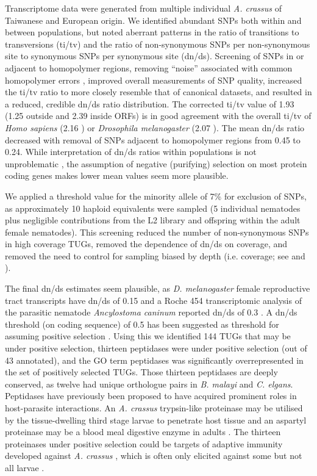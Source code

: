 \documentclass[10pt]{bmc_article}
\newenvironment{bmcformat}{\begin{raggedright}\baselineskip20pt\sloppy\setboolean{publ}{false}}{\end{raggedright}\baselineskip20pt\sloppy}
\begin{document}
\begin{bmcformat}
Transcriptome data were generated from multiple individual
\textit{A. crassus} of Taiwanese and European origin. We identified
abundant SNPs both within and between populations, but noted aberrant
patterns in the ratio of transitions to transversions (ti/tv) and the
ratio of non-synonymous SNPs per non-synonymous site to synonymous
SNPs per synonymous site (dn/ds). Screening of SNPs in or adjacent to
homopolymer regions, removing “noise'' associated with common
homopolymer errors \cite{pmid21685085}, improved overall measurements
of SNP quality, increased the ti/tv ratio to more closely resemble
that of canonical datasets, and resulted in a reduced, credible dn/ds
ratio distribution. The corrected ti/tv value of 1.93 (1.25 outside
and 2.39 inside ORFs) is in good agreement with the overall ti/tv of
\textit{Homo sapiens} (2.16 \cite{pmid21169219}) or \textit{Drosophila
  melanogaster} (2.07 \cite{pmid21143862}). The mean dn/ds ratio
decreased with removal of SNPs adjacent to homopolymer regions from
0.45 to 0.24. While interpretation of dn/ds ratios within populations
is not unproblematic \cite{pmid19081788}, the assumption of negative
(purifying) selection on most protein coding genes makes lower mean
values seem more plausible.

We applied a threshold value for the minority allele of 7\% for
exclusion of SNPs, as approximately 10 haploid equivalents were
sampled (5 individual nematodes plus negligible contributions from the
L2 library and offspring within the adult female nematodes). This
screening reduced the number of non-synonymous SNPs in high coverage
TUGs, removed the dependence of dn/ds on coverage, and removed the
need to control for sampling biased by depth (i.e. coverage; see
\cite{pmid18590545} and \cite{pmid20478048}).

The final dn/ds estimates seem plausible, as \textit{D. melanogaster}
female reproductive tract transcripts have dn/ds of 0.15
\cite{pmid15579698} and a Roche 454 transcriptomic analysis of the
parasitic nematode \textit{Ancylostoma caninum} reported dn/ds of 0.3
\cite{pmid20470405}. A dn/ds threshold (on coding sequence) of 0.5 has
been suggested as threshold for assuming positive selection
\cite{pmid15579698}. Using this we identified 144 TUGs that may be
under positive selection, thirteen peptidases were under positive
selection (out of 43 annotated), and the GO term peptidases was
significantly overrepresented in the set of positively selected
TUGs. Those thirteen peptidases are deeply conserved, as twelve had
unique orthologue pairs in \textit{B. malayi} and
\textit{C. elgans}. Peptidases have previously been proposed to have
acquired prominent roles in host-parasite interactions. An
\textit{A. crassus} trypsin-like proteinase may be utilised by the
tissue-dwelling third stage larvae to penetrate host tissue and an
aspartyl proteinase may be a blood meal digestive enzyme in adults
\cite{polzer_identification_1993}. The thirteen proteinases under
positive selection could be targets of adaptive immunity developed
against \textit{A. crassus} \cite{knopf_migratory_2008,
  knopf_vaccination_2008}, which is often only elicited against some
but not all larvae \cite{molnar_caps}.


\end{bmcformat}
\end{document}
